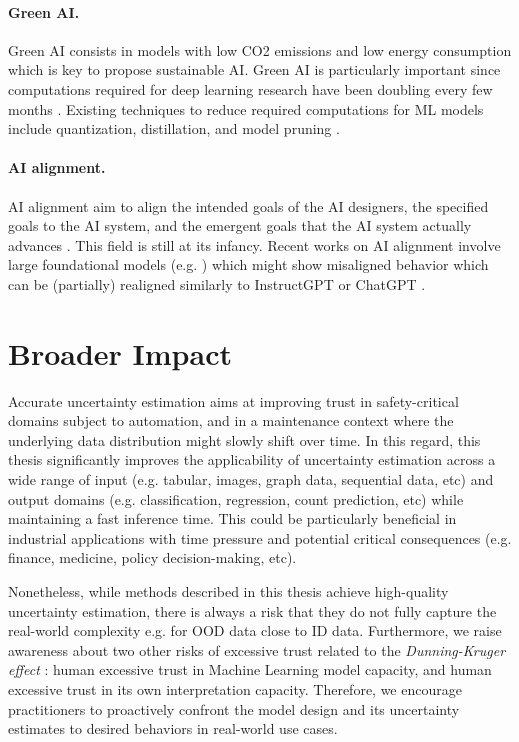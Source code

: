 \paragraph{Green AI.} Green AI consists in models with low CO2 emissions and low energy consumption which is key to propose sustainable AI. Green AI is particularly important since computations required for deep learning research have been doubling every few months \cite{schwartz2019greenAI}. Existing techniques to reduce required computations for ML models include quantization, distillation, and model pruning \cite{neill2020compression}. 

\paragraph{AI alignment.} AI alignment aim to align the intended goals of the AI designers,  the specified goals to the AI system, and the emergent goals that the AI system actually advances \cite{bostrom2014superintelligence, gabriel2020AI}. This field is still at its infancy. Recent works on AI alignment involve large foundational models (e.g. \cite{gpt, rombach2021highresolution, galactica}) which might show misaligned behavior which can be (partially) realigned similarly to InstructGPT \cite{instructgpt} or ChatGPT \cite{chatgpt}.

\section{Broader Impact}

Accurate uncertainty estimation aims at improving trust in safety-critical domains subject to automation, and in a maintenance context where the underlying data distribution might slowly shift over time. In this regard, this thesis significantly improves the applicability of uncertainty estimation across a wide range of input (e.g. tabular, images, graph data, sequential data, etc) and output domains (e.g. classification, regression, count prediction, etc) while maintaining a fast inference time. This could be particularly beneficial in industrial applications with time pressure and potential critical consequences (e.g. finance, medicine, policy decision-making, etc).

Nonetheless, while methods described in this thesis achieve high-quality uncertainty estimation, there is always a risk that they do not fully capture the real-world complexity e.g. for OOD data close to ID data. Furthermore, we raise awareness about two other risks of excessive trust related to the \emph{Dunning-Kruger effect} \citep{dunning-kruger}: human excessive trust in Machine Learning model capacity, and human excessive trust in its own interpretation capacity. Therefore, we encourage practitioners to proactively confront the model design and its uncertainty estimates to desired behaviors in real-world use cases.

